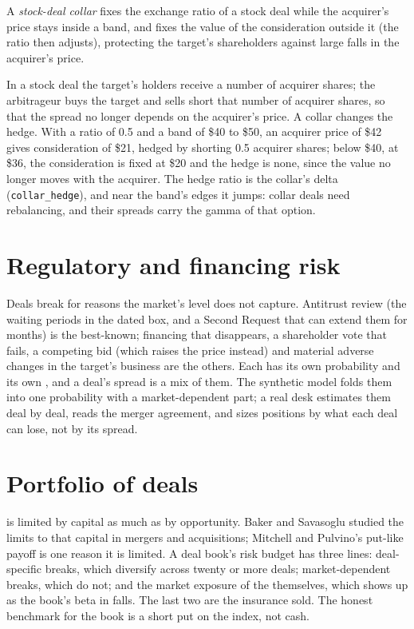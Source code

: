 \begin{definition}\label{def:s1:merger-arbitrage:collar}
A \emph{stock-deal collar} fixes the exchange ratio of a stock deal while the acquirer's price stays inside a band, and fixes the
value of the consideration outside it (the ratio then adjusts), protecting the target's shareholders against large falls in the acquirer's price.
\end{definition}

In a stock deal the target's holders receive a number of acquirer shares; the arbitrageur buys the target and sells short that number of acquirer shares,
so that the spread no longer depends on the acquirer's price. A collar changes the hedge. With a ratio of 0.5 and a band of \$40 to \$50, an acquirer price of
\$42 gives consideration of \$21, hedged by shorting 0.5 acquirer shares; below \$40, at \$36, the consideration is fixed at \$20 and the hedge is none, since
the value no longer moves with the acquirer. The hedge ratio is the collar's delta (\texttt{collar\_hedge}), and near the band's edges it jumps: collar
deals need rebalancing, and their spreads carry the gamma of that option.

\section{Regulatory and financing risk}

Deals break for reasons the market's level does not capture. Antitrust review (the waiting periods in the dated box, and a Second Request that can extend
them for months) is the best-known; financing that disappears, a shareholder vote that fails, a competing bid (which raises the price instead) and material
adverse changes in the target's business are the others. Each has its own probability and its own , and a deal's spread is a mix of them. The
synthetic model folds them into one probability with a market-dependent part; a real desk estimates them deal by deal, reads the merger agreement, and sizes
positions by what each deal can lose, not by its spread.

\section{Portfolio of deals}

 is limited by capital as much as by opportunity. Baker and Savasoglu studied the limits to that capital in
mergers and acquisitions; Mitchell and Pulvino's put-like payoff is one reason it is limited. A deal book's risk budget has three lines: deal-specific
breaks, which diversify across twenty or more deals; market-dependent breaks, which do not; and the market exposure of the  themselves, which
shows up as the book's beta in falls. The last two are the insurance sold. The honest benchmark for the book is a short put on the index, not cash.

